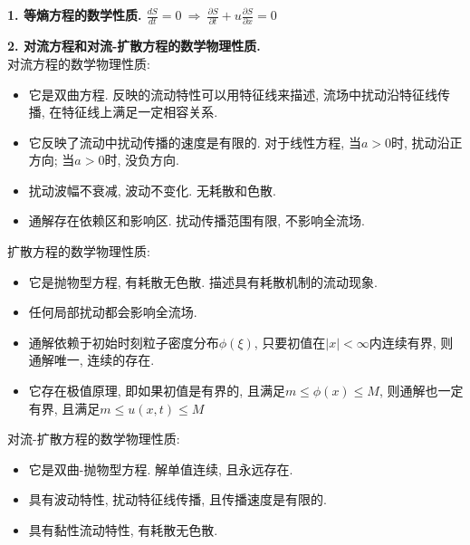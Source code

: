 
\noindent \textbf{1. 等熵方程的数学性质. $\displaystyle \frac{dS}{dt}=0\:\Rightarrow\: \frac{\partial S}{\partial t}+u\frac{\partial S}{\partial x}=0$}
\vspace{1em}

\noindent \textbf{2. 对流方程和对流-扩散方程的数学物理性质.}\\
对流方程的数学物理性质:
\begin{itemize}
\item 它是双曲方程. 反映的流动特性可以用特征线来描述, 流场中扰动沿特征线传播, 在特征线上满足一定相容关系.
\item 它反映了流动中扰动传播的速度是有限的. 对于线性方程, 当$a>0$时, 扰动沿正方向; 当$a>0$时, 没负方向.
\item 扰动波幅不衰减, 波动不变化. 无耗散和色散.
\item 通解存在依赖区和影响区. 扰动传播范围有限, 不影响全流场.
\end{itemize}
扩散方程的数学物理性质:
\begin{itemize}
\item 它是抛物型方程, 有耗散无色散. 描述具有耗散机制的流动现象.
\item 任何局部扰动都会影响全流场.
\item 通解依赖于初始时刻粒子密度分布$\phi(\xi)$, 只要初值在$|x|<\infty$内连续有界, 则通解唯一, 连续的存在.
\item 它存在极值原理, 即如果初值是有界的, 且满足$m\leq \phi(x)\leq M$, 则通解也一定有界, 且满足$m\leq u(x,t)\leq M$
\end{itemize}
对流-扩散方程的数学物理性质:
\begin{itemize}
\item 它是双曲-抛物型方程. 解单值连续, 且永远存在.
\item 具有波动特性, 扰动特征线传播, 且传播速度是有限的.
\item 具有黏性流动特性, 有耗散无色散.
\end{itemize}
\vspace{1em}

